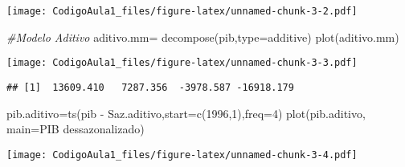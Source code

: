 \documentclass[
]{article}
\newenvironment{Shaded}{\begin{snugshade}}{\end{snugshade}}
\newcommand{\AttributeTok}[1]{\textcolor[rgb]{0.77,0.63,0.00}{#1}}
\newcommand{\CommentTok}[1]{\textcolor[rgb]{0.56,0.35,0.01}{\textit{#1}}}
\newcommand{\DecValTok}[1]{\textcolor[rgb]{0.00,0.00,0.81}{#1}}
\newcommand{\FunctionTok}[1]{\textcolor[rgb]{0.00,0.00,0.00}{#1}}
\newcommand{\NormalTok}[1]{#1}
\newcommand{\OtherTok}[1]{\textcolor[rgb]{0.56,0.35,0.01}{#1}}
\newcommand{\SpecialCharTok}[1]{\textcolor[rgb]{0.00,0.00,0.00}{#1}}
\newcommand{\StringTok}[1]{\textcolor[rgb]{0.31,0.60,0.02}{#1}}
\begin{document}
\texttt{[image: CodigoAula1\_files/figure-latex/unnamed-chunk-3-2.pdf]}

\begin{Shaded}
\begin{Highlighting}[]
\CommentTok{\#Modelo Aditivo}
\NormalTok{aditivo.mm}\OtherTok{=} \FunctionTok{decompose}\NormalTok{(pib,}\AttributeTok{type=}\StringTok{\textquotesingle{}additive\textquotesingle{}}\NormalTok{)}
\FunctionTok{plot}\NormalTok{(aditivo.mm)}
\end{Highlighting}
\end{Shaded}

\texttt{[image: CodigoAula1\_files/figure-latex/unnamed-chunk-3-3.pdf]}

\begin{Shaded}
\end{Shaded}

\begin{verbatim}
## [1]  13609.410   7287.356  -3978.587 -16918.179
\end{verbatim}

\begin{Shaded}
\begin{Highlighting}[]
\NormalTok{pib.aditivo}\OtherTok{=}\FunctionTok{ts}\NormalTok{(pib }\SpecialCharTok{{-}}\NormalTok{ Saz.aditivo,}\AttributeTok{start=}\FunctionTok{c}\NormalTok{(}\DecValTok{1996}\NormalTok{,}\DecValTok{1}\NormalTok{),}\AttributeTok{freq=}\DecValTok{4}\NormalTok{)}
\FunctionTok{plot}\NormalTok{(pib.aditivo, }\AttributeTok{main=}\StringTok{\textquotesingle{}PIB dessazonalizado\textquotesingle{}}\NormalTok{)}
\end{Highlighting}
\end{Shaded}

\texttt{[image: CodigoAula1\_files/figure-latex/unnamed-chunk-3-4.pdf]}
\end{document}
